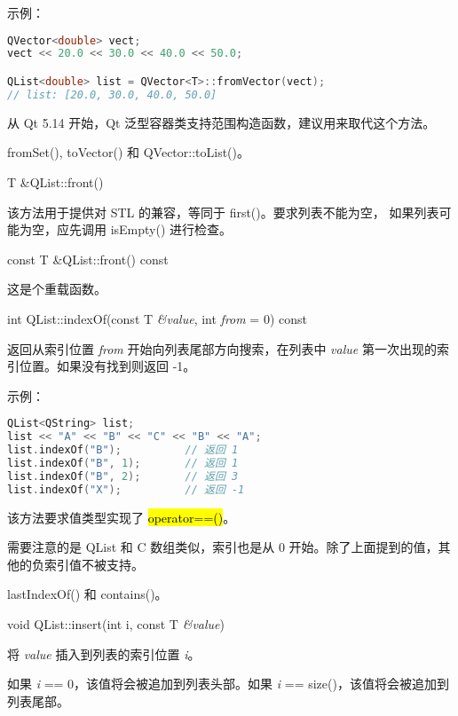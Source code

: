 示例：


\begin{lstlisting}[language=C++]
QVector<double> vect;
vect << 20.0 << 30.0 << 40.0 << 50.0;

QList<double> list = QVector<T>::fromVector(vect);
// list: [20.0, 30.0, 40.0, 50.0]
\end{lstlisting}


\begin{notice}
从 Qt 5.14 开始，Qt 泛型容器类支持范围构造函数，建议用来取代这个方法。
\end{notice}

\begin{seeAlso}
fromSet(), toVector() 和 QVector::toList()。
\end{seeAlso}

T \&QList::front()

该方法用于提供对 STL 的兼容，等同于 first()。要求列表不能为空， 如果列表可能为空，应先调用 isEmpty() 进行检查。

const T \&QList::front() const

这是个重载函数。

int QList::indexOf(const T \emph{\&value}, int \emph{from} = 0) const

返回从索引位置 \emph{from} 开始向列表尾部方向搜索，在列表中 \emph{value} 第一次出现的索引位置。如果没有找到则返回 -1。

示例：



\begin{lstlisting}[language=C++]
QList<QString> list;
list << "A" << "B" << "C" << "B" << "A";
list.indexOf("B");          // 返回 1
list.indexOf("B", 1);       // 返回 1
list.indexOf("B", 2);       // 返回 3
list.indexOf("X");          // 返回 -1
\end{lstlisting}



该方法要求值类型实现了 \hl{operator==()}。

需要注意的是 QList 和 C 数组类似，索引也是从 0 开始。除了上面提到的值，其他的负索引值不被支持。

\begin{seeAlso}
lastIndexOf() 和 contains()。
\end{seeAlso}


void QList::insert(int i, const T \emph{\&value})

将 \emph{value} 插入到列表的索引位置 \emph{i}。

如果 \emph{i} == 0，该值将会被追加到列表头部。如果 \emph{i} == size()，该值将会被追加到列表尾部。


